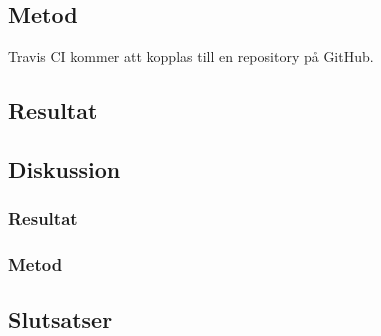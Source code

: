 \subsection{Metod}
Travis CI kommer att kopplas till en repository på GitHub.

\subsection{Resultat}
\subsection{Diskussion}
\subsubsection{Resultat}
\subsubsection{Metod}
\subsection{Slutsatser}
